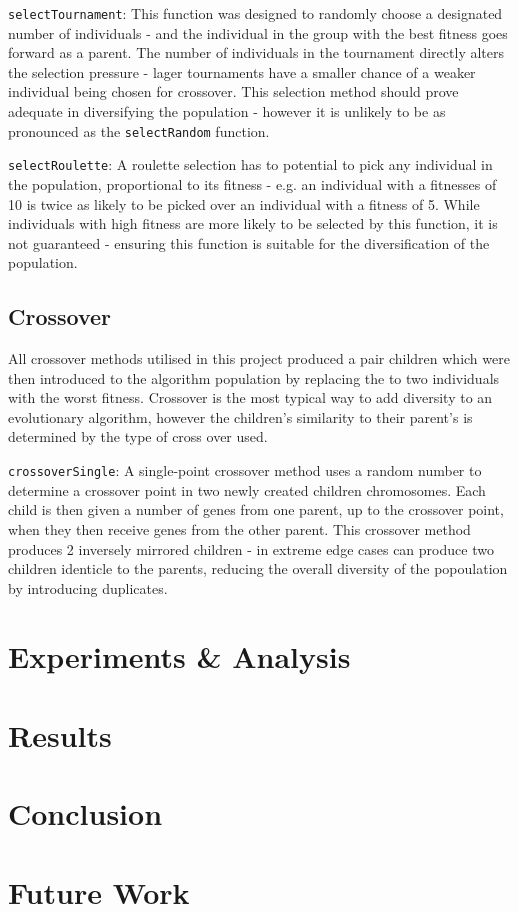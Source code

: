 			\texttt{selectTournament}: This function was designed to randomly choose a designated number of individuals - and the individual in the group with the best fitness goes forward as a parent. The number of individuals in the tournament directly alters the selection pressure - lager tournaments have a smaller chance of a weaker individual being chosen for crossover. This selection method should prove adequate in diversifying the population - however it is unlikely to be as pronounced as the \texttt{selectRandom} function.
			
			\texttt{selectRoulette}: A roulette selection has to potential to pick any individual in the population, proportional to its fitness - e.g. an individual with a fitnesses of 10 is twice as likely to be picked over an individual with a fitness of 5. While individuals with high fitness are more likely to be selected by this function, it is not guaranteed - ensuring this function is suitable for the diversification of the population.
		
		\subsection{Crossover}
		All  crossover methods utilised in this project produced a pair children which were then introduced to the algorithm population by replacing the to two individuals with the worst fitness. Crossover is the most typical way to add diversity to an evolutionary algorithm, however the children's similarity to their parent's is determined by the type of cross over used.
		
			\texttt{crossoverSingle}: A single-point crossover method uses a random number to determine a crossover point in two newly created children chromosomes. Each child is then given a number of genes from one parent, up to the crossover point, when they then receive genes from the other parent. This crossover method produces 2 inversely mirrored children - in extreme edge cases can produce two children identicle to the parents, reducing the overall diversity of the popoulation by introducing duplicates. 
			
\section{Experiments \& Analysis}


\section{Results}
	

\section{Conclusion}


\section{Future Work}
